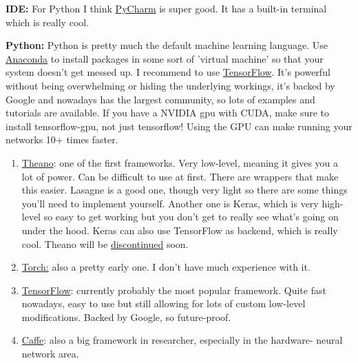 \documentclass[]{article}
\begin{document}
\textbf{IDE:} For Python I think \href{https://docs.anaconda.com/anaconda/user-guide/tasks/integration/pycharm}{PyCharm} is super good. It has a built-in terminal which is really cool. 

\textbf{Python: } Python is pretty much the default machine learning language. Use \href{https://www.anaconda.com/download/#linux}{Anaconda} to install packages in some sort of 'virtual machine' so that your system doesn't get messed up.
I recommend to use \href{https://www.tensorflow.org/get_started/}{TensorFlow}. It's powerful without being overwhelming or hiding the underlying workings, it's backed by Google and nowadays has the largest community, so lots of examples and tutorials are available. 
If you have a NVIDIA gpu with CUDA, make sure to install tensorflow-gpu, not just tensorflow! Using the GPU can make running your networks 10+ times faster.

\begin{enumerate}
	\item \href{http://www.deeplearning.net/software/theano/}{Theano}: one of the first frameworks. Very low-level, meaning it gives you a lot of power. Can be difficult to use at first. There are wrappers that make this easier. Lasagne is a good one, though very light so there are some things you'll need to implement yourself. Another one is Keras, which is very high-level so easy to get working but you don't get to really see what's going on under the hood. Keras can also use TensorFlow as backend, which is really cool. Theano will be \href{https://groups.google.com/forum/#!topic/theano-users/7Poq8BZutbY}{discontinued} soon.
	\item \href{http://torch.ch/Torch}{Torch:} also a pretty early one. I don't have much experience with it.
	\item \href{https://www.tensorflow.org/}{TensorFlow}: currently probably the most popular framework. Quite fast nowadays, easy to use but still allowing for lots of custom low-level modifications. Backed by Google, so future-proof. 
	\item \href{http://caffe.berkeleyvision.org/}{Caffe}: also a big framework in researcher, especially in the hardware- neural network area.
\end{enumerate}
\end{document}
